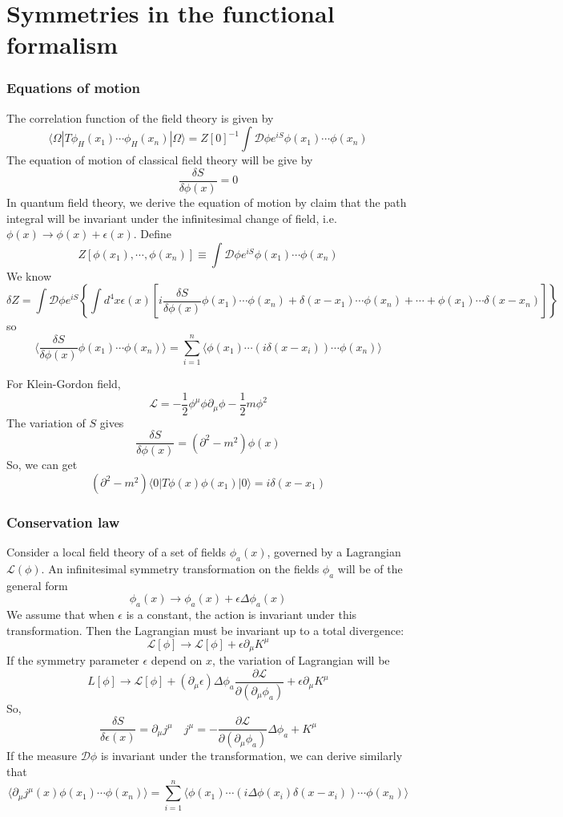 \documentclass[cyan]{elegantnote}
\begin{document}
\section{Symmetries in the functional formalism}
\subsubsection{Equations of motion}
\noindent
The correlation function of the field theory is given by
\[\langle \Omega | T \phi_H(x_1) \cdots \phi_H(x_n) | \Omega \rangle = Z[0]^{-1} \int \mathcal{D}\phi e^{iS} \phi(x_1)\cdots\phi(x_n)\]
The equation of motion of classical field theory will be give by
\[\frac{\delta S}{\delta \phi(x)} = 0\]
In quantum field theory, we derive the equation of motion by claim that the path integral will be invariant under the infinitesimal change of field, i.e. $\phi(x) \to \phi(x) + \epsilon(x)$.
Define
\[Z[\phi(x_1),\cdots,\phi(x_n)] \equiv  \int \mathcal{D}\phi e^{iS} \phi(x_1)\cdots\phi(x_n)\]
We know
\[\delta Z = \int \mathcal{D}\phi e^{iS} \left\{ \int d^4x \epsilon(x) \left[ i\frac{\delta S}{\delta \phi(x)} \phi(x_1)\cdots\phi(x_n) + \delta(x-x_1)\cdots\phi(x_n) + \cdots + \phi(x_1)\cdots\delta(x-x_n) \right]\right\} \]
so
\[\langle \frac{\delta S}{\delta \phi(x)} \phi(x_1)\cdots\phi(x_n) \rangle  = \sum_{i=1}^{n} \langle \phi(x_1) \cdots (i\delta(x-x_i)) \cdots \phi(x_n) \rangle\]
\begin{example}
For Klein-Gordon field,
\[\mathcal{L} = -\frac{1}{2}\phi^{\mu}\phi \partial_{\mu}\phi - \frac{1}{2}m\phi^2\]
The variation of $S$ gives
\[\frac{\delta S}{\delta \phi(x)} = (\partial^2-m^2)\phi(x)\]
So, we can get
\[(\partial^2-m^2) \langle 0 | T \phi(x)\phi(x_1)| 0 \rangle = i\delta(x-x_1)\]
\end{example}
\subsubsection{Conservation law}
Consider a local field theory of a set of fields $\phi_a(x)$, governed by a Lagrangian $\mathcal{L}(\phi)$. An infinitesimal symmetry transformation on the fields $\phi_a$ will be of the general form 
\[\phi_a(x) \to \phi_a(x) + \epsilon \Delta \phi_a(x)\]
We assume that when $\epsilon$ is a constant, the action is invariant under this transformation. Then the Lagrangian must be invariant up to a total divergence:
\[\mathcal{L}[\phi] \to \mathcal{L}[\phi] + \epsilon \partial_{\mu} K^{\mu}\]
If the symmetry parameter $\epsilon$ depend on $x$, the variation of Lagrangian will be
\[L[\phi] \to \mathcal{L}[\phi] + (\partial_{\mu}\epsilon)\Delta \phi_a \frac{\partial \mathcal{L}}{\partial (\partial_{\mu}\phi_a)} + \epsilon \partial_{\mu} K^{\mu}\]
So, 
\[\frac{\delta S}{\delta \epsilon(x)} = \partial_{\mu} j^{\mu} \quad j^{\mu} = -\frac{\partial \mathcal{L}}{\partial (\partial_{\mu}\phi_a)}\Delta \phi_a + K^{\mu} \]
If the measure $\mathcal{D}\phi$ is invariant under the transformation, we can derive similarly that
\[\langle \partial_{\mu} j^{\mu}(x) \phi(x_1)\cdots\phi(x_n) \rangle  = \sum_{i=1}^{n} \langle \phi(x_1) \cdots (i\Delta \phi(x_i)\delta(x-x_i)) \cdots \phi(x_n) \rangle\]
\end{document}
